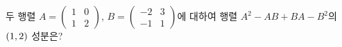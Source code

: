 두 행렬 $A=\begin{pmatrix} 1 & 0 \\ 1 & 2 \end{pmatrix}$, $B=\begin{pmatrix} -2 & 3 \\ -1 & 1 \end{pmatrix}$에 대하여 행렬 $A^2-AB+BA-B^2$의 $(1{,}\mkern3mu\mathopen{}2)$ 성분은?
